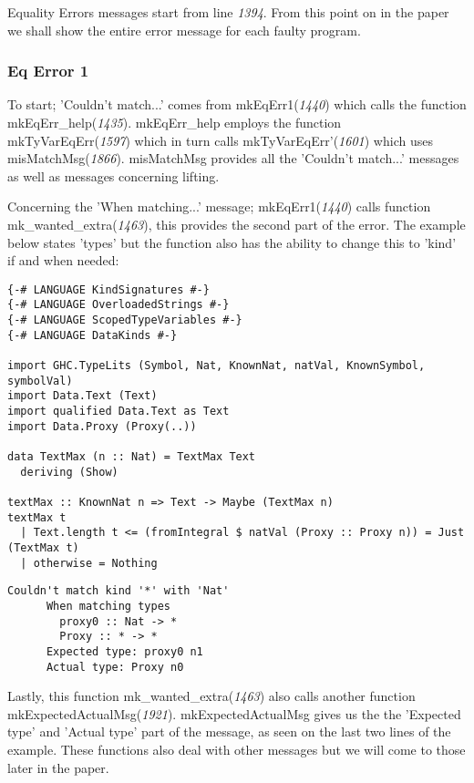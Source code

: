 \documentclass[a4paper]{article}
\begin{document}
Equality Errors messages start from line \textit{1394}. From this point on in the paper we shall show the entire error message for each faulty program.

\subsubsection{Eq Error 1}

To start; 'Couldn't match...' comes from mkEqErr1(\textit{1440}) which calls the function mkEqErr\_help(\textit{1435}). mkEqErr\_help employs the function mkTyVarEqErr(\textit{1597}) which in turn calls mkTyVarEqErr'(\textit{1601}) which uses misMatchMsg(\textit{1866}). misMatchMsg provides all the 'Couldn't match...' messages as well as messages concerning lifting. 

Concerning the 'When matching...' message; mkEqErr1(\textit{1440}) calls function mk\_wanted\_extra(\textit{1463}), this provides the second part of the error. The example below states 'types' but the function also has the ability to change this to 'kind' if and when needed:

\begin{lstlisting}[label={lst: T7.0}, numbers=none, caption={Example Program \cite{ex7}}]
{-# LANGUAGE KindSignatures #-}
{-# LANGUAGE OverloadedStrings #-}
{-# LANGUAGE ScopedTypeVariables #-}
{-# LANGUAGE DataKinds #-}

import GHC.TypeLits (Symbol, Nat, KnownNat, natVal, KnownSymbol, symbolVal)
import Data.Text (Text)
import qualified Data.Text as Text
import Data.Proxy (Proxy(..))

data TextMax (n :: Nat) = TextMax Text
  deriving (Show)

textMax :: KnownNat n => Text -> Maybe (TextMax n)
textMax t
  | Text.length t <= (fromIntegral $ natVal (Proxy :: Proxy n)) = Just (TextMax t)
  | otherwise = Nothing
\end{lstlisting}

\begin{lstlisting}[label={lst: T7.0.2}, numbers=none, caption={Error}]
Couldn't match kind '*' with 'Nat'
      When matching types
        proxy0 :: Nat -> *
        Proxy :: * -> *
      Expected type: proxy0 n1
      Actual type: Proxy n0
\end{lstlisting}

Lastly, this function mk\_wanted\_extra(\textit{1463}) also calls another function mkExpectedActualMsg(\textit{1921}). mkExpectedActualMsg gives us the the 'Expected type' and 'Actual type' part of the message, as seen on the last two lines of the example. These functions also deal with other messages but we will come to those later in the paper.
\end{document}

